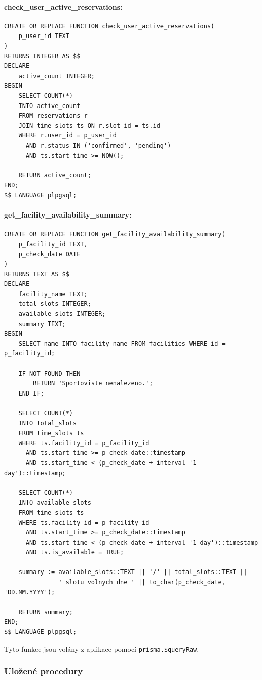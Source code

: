 \documentclass[12pt, a4paper]{article}
\begin{document}
\paragraph{check\_user\_active\_reservations:}
\begin{lstlisting}
CREATE OR REPLACE FUNCTION check_user_active_reservations(
    p_user_id TEXT
)
RETURNS INTEGER AS $$
DECLARE
    active_count INTEGER;
BEGIN
    SELECT COUNT(*)
    INTO active_count
    FROM reservations r
    JOIN time_slots ts ON r.slot_id = ts.id
    WHERE r.user_id = p_user_id
      AND r.status IN ('confirmed', 'pending')
      AND ts.start_time >= NOW();

    RETURN active_count;
END;
$$ LANGUAGE plpgsql;
\end{lstlisting}

\paragraph{get\_facility\_availability\_summary:}
\begin{lstlisting}
CREATE OR REPLACE FUNCTION get_facility_availability_summary(
    p_facility_id TEXT,
    p_check_date DATE
)
RETURNS TEXT AS $$
DECLARE
    facility_name TEXT;
    total_slots INTEGER;
    available_slots INTEGER;
    summary TEXT;
BEGIN
    SELECT name INTO facility_name FROM facilities WHERE id = p_facility_id;

    IF NOT FOUND THEN
        RETURN 'Sportoviste nenalezeno.';
    END IF;

    SELECT COUNT(*)
    INTO total_slots
    FROM time_slots ts
    WHERE ts.facility_id = p_facility_id
      AND ts.start_time >= p_check_date::timestamp
      AND ts.start_time < (p_check_date + interval '1 day')::timestamp;

    SELECT COUNT(*)
    INTO available_slots
    FROM time_slots ts
    WHERE ts.facility_id = p_facility_id
      AND ts.start_time >= p_check_date::timestamp
      AND ts.start_time < (p_check_date + interval '1 day')::timestamp
      AND ts.is_available = TRUE;

    summary := available_slots::TEXT || '/' || total_slots::TEXT || 
               ' slotu volnych dne ' || to_char(p_check_date, 'DD.MM.YYYY');

    RETURN summary;
END;
$$ LANGUAGE plpgsql;
\end{lstlisting}

Tyto funkce jsou volány z aplikace pomocí \texttt{prisma.\$queryRaw}.

\subsubsection{Uložené procedury}
\label{subsubsec:ulozene_procedury}
\end{document}
